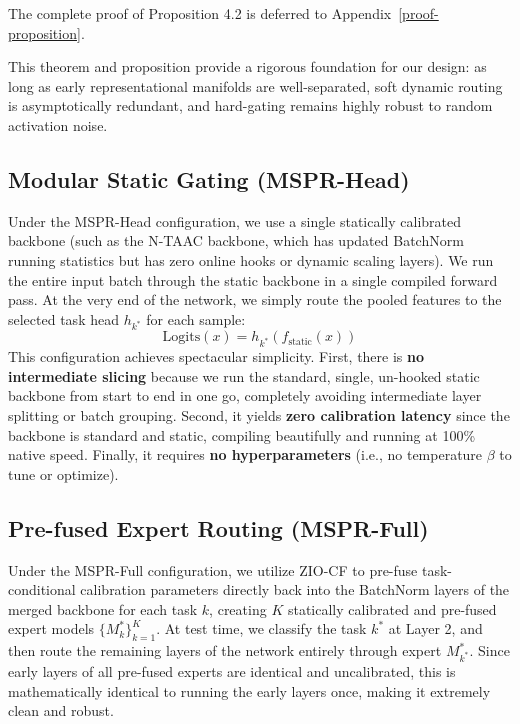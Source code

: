 \documentclass{article}
\theoremstyle{plain}
\theoremstyle{definition}
\theoremstyle{remark}
\begin{document}
The complete proof of Proposition 4.2 is deferred to Appendix~\ref{proof-proposition}.

This theorem and proposition provide a rigorous foundation for our design: as long as early representational manifolds are well-separated, soft dynamic routing is asymptotically redundant, and hard-gating remains highly robust to random activation noise.

\subsection{Modular Static Gating (MSPR-Head)}
Under the MSPR-Head configuration, we use a single statically calibrated backbone (such as the N-TAAC backbone, which has updated BatchNorm running statistics but has zero online hooks or dynamic scaling layers). We run the entire input batch through the static backbone in a single compiled forward pass. At the very end of the network, we simply route the pooled features to the selected task head $h_{k^*}$ for each sample:
\begin{equation}
\text{Logits}(x) = h_{k^*}(f_{\text{static}}(x))
\end{equation}
This configuration achieves spectacular simplicity. First, there is \textbf{no intermediate slicing} because we run the standard, single, un-hooked static backbone from start to end in one go, completely avoiding intermediate layer splitting or batch grouping. Second, it yields \textbf{zero calibration latency} since the backbone is standard and static, compiling beautifully and running at 100\% native speed. Finally, it requires \textbf{no hyperparameters} (i.e., no temperature $\beta$ to tune or optimize).

\subsection{Pre-fused Expert Routing (MSPR-Full)}
Under the MSPR-Full configuration, we utilize ZIO-CF to pre-fuse task-conditional calibration parameters directly back into the BatchNorm layers of the merged backbone for each task $k$, creating $K$ statically calibrated and pre-fused expert models $\{M^*_k\}_{k=1}^K$. At test time, we classify the task $k^*$ at Layer 2, and then route the remaining layers of the network entirely through expert $M^*_{k^*}$. Since early layers of all pre-fused experts are identical and uncalibrated, this is mathematically identical to running the early layers once, making it extremely clean and robust.
\end{document}
